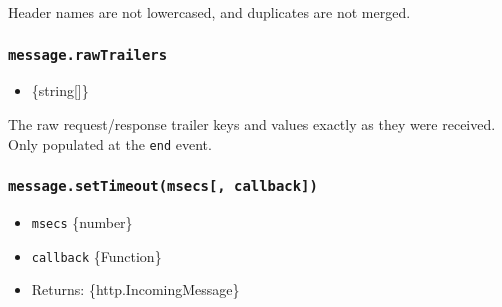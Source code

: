 Header names are not lowercased, and duplicates are not merged.

\begin{Shaded}
\begin{Highlighting}[]
\CommentTok{//}
\CommentTok{// [ \textquotesingle{}user{-}agent\textquotesingle{},}
\CommentTok{//   \textquotesingle{}*/*\textquotesingle{} ]}
\NormalTok{)}\OperatorTok{;}
\end{Highlighting}
\end{Shaded}

\subsubsection{\texorpdfstring{\texttt{message.rawTrailers}}{message.rawTrailers}}\label{message.rawtrailers}

\begin{itemize}
\tightlist
\item
  \{string{[}{]}\}
\end{itemize}

The raw request/response trailer keys and values exactly as they were
received. Only populated at the
\texttt{\textquotesingle{}end\textquotesingle{}} event.

\subsubsection{\texorpdfstring{\texttt{message.setTimeout(msecs{[},\ callback{]})}}{message.setTimeout(msecs{[}, callback{]})}}\label{message.settimeoutmsecs-callback}

\begin{itemize}
\tightlist
\item
  \texttt{msecs} \{number\}
\item
  \texttt{callback} \{Function\}
\item
  Returns: \{http.IncomingMessage\}
\end{itemize}

